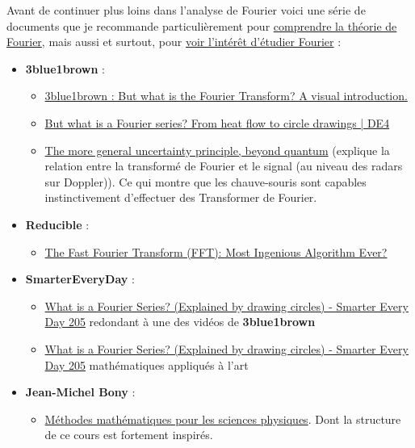 \documentclass[a4paper]{book}
\begin{document}
Avant de continuer plus loins dans l'analyse de Fourier voici une série de
documents que je recommande particulièrement pour \underline{comprendre la
théorie de Fourier}, mais aussi et surtout, pour \underline{voir l'intérêt
d'étudier Fourier} :
\begin{itemize}
	\item \textbf{3blue1brown} :
		\begin{itemize}
			\item \href{https://www.youtube.com/watch?v=spUNpyF58BY}
				{3blue1brown : But what is the Fourier Transform? 
				A visual introduction.}
			\item \href{https://www.youtube.com/watch?v=r6sGWTCMz2k}{But
				what is a Fourier series? From heat flow to
				circle drawings | DE4}
			\item \href{https://www.youtube.com/watch?v=MBnnXbOM5S4}{The
				more general uncertainty principle, beyond
				quantum} (explique la relation entre la
				transformé de Fourier et le signal (au niveau
				des radars sur Doppler)). Ce qui montre que les
				chauve-souris sont capables instinctivement
				d'effectuer des Transformer de Fourier.
		\end{itemize}
	\item \textbf{Reducible} :
		\begin{itemize}
			\item \href{https://www.youtube.com/watch?v=h7apO7q16V0}{The
				Fast Fourier Transform (FFT): Most Ingenious
				Algorithm Ever?}
		\end{itemize}
	\item \textbf{SmarterEveryDay} :
		\begin{itemize}
			\item \href{https://www.youtube.com/watch?v=ds0cmAV-Yek}{
					What is a Fourier Series? (Explained by
					drawing circles) - Smarter Every Day
					205} redondant à une des vidéos de
					\textbf{3blue1brown} 
			\item \href{https://www.youtube.com/watch?v=4gibcRfp4zA}{
					What is a Fourier Series? (Explained by
					drawing circles) - Smarter Every Day
					205} mathématiques appliqués à l'art
		\end{itemize}
	\item \textbf{Jean-Michel Bony} :
		\begin{itemize}
			\item \underline{Méthodes mathématiques pour les sciences
				physiques}. Dont la structure de ce cours est
				fortement inspirés.
\end{itemize}



\end{itemize}
\end{document}
